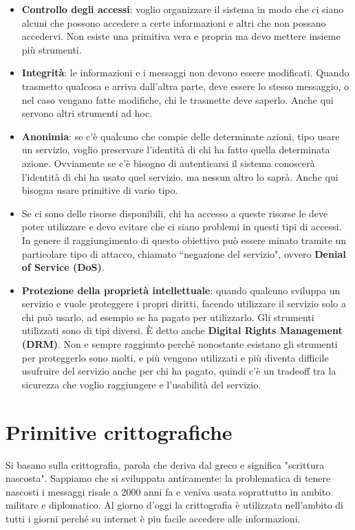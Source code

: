 \begin{itemize}
    \item \textbf{Controllo degli accessi}: voglio organizzare il sistema in modo che ci siano alcuni che possono accedere a certe informazioni e altri che non possano accedervi. Non esiste una primitiva vera e propria ma devo mettere insieme più strumenti.
    \item \textbf{Integrità}: le informazioni e i messaggi non devono essere modificati. Quando trasmetto qualcosa e arriva dall'altra parte, deve essere lo stesso messaggio, o nel caso vengano fatte modifiche, chi le trasmette deve saperlo. Anche qui servono altri strumenti ad hoc.
    \item \textbf{Anonimia}: se c’è qualcuno che compie delle determinate azioni, tipo usare un servizio, voglio preservare l’identità di chi ha fatto quella determinata azione. Ovviamente se c’è bisogno di autenticarsi il sistema conoscerà l’identità di chi ha usato quel servizio, ma nessun altro lo saprà. Anche qui bisogna usare primitive di vario tipo.
    \item Se ci sono delle risorse disponibili, chi ha accesso a queste risorse le deve poter utilizzare e devo evitare che ci siano problemi in questi tipi di accessi. In genere il raggiungimento di questo obiettivo può essere minato tramite un particolare tipo di attacco,  chiamato “negazione del servizio", ovvero \textbf{Denial of Service (DoS)}. 
    \item \textbf{Protezione della proprietà intellettuale}: quando qualcuno sviluppa un servizio e vuole proteggere i propri diritti,  facendo utilizzare il servizio solo a chi può usarlo, ad esempio se ha pagato per utilizzarlo. Gli strumenti utilizzati sono di tipi diversi. È detto anche \textbf{Digital Rights Management (DRM)}. Non e sempre raggiunto perché nonostante esistano gli strumenti per proteggerlo sono molti, e più vengono utilizzati e più diventa difficile usufruire del servizio anche per chi ha pagato, quindi c'è un tradeoff tra la sicurezza che voglio raggiungere e l’usabilità del servizio.
\end{itemize}

\section{Primitive crittografiche}
Si basano  sulla crittografia, parola che deriva dal greco e significa "scrittura nascosta". Sappiamo che si sviluppata anticamente: la problematica di tenere nascosti i messaggi risale a 2000 anni fa e veniva usata soprattutto in ambito militare e diplomatico. Al giorno d'oggi la crittografia è utilizzata nell'ambito di tutti i giorni perché su internet è piu facile accedere alle informazioni.

